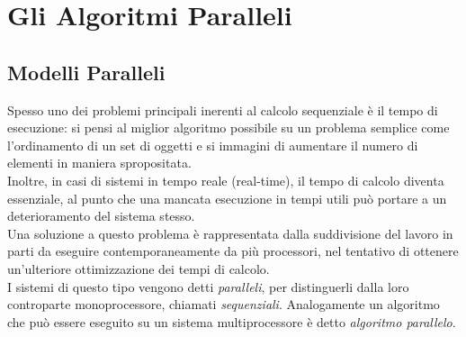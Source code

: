 \chapter{Gli Algoritmi Paralleli}
\section{Modelli Paralleli}
Spesso uno dei problemi principali inerenti al calcolo sequenziale è il tempo di esecuzione: si pensi al miglior algoritmo possibile su un problema semplice come l'ordinamento di un set di oggetti e si immagini di aumentare il numero di elementi in maniera spropositata.\\
Inoltre, in casi di sistemi in tempo reale (real-time), il tempo di calcolo diventa essenziale, al punto che una mancata esecuzione in tempi utili può portare a un deterioramento del sistema stesso.\\
Una soluzione a questo problema è rappresentata dalla suddivisione del lavoro in parti da eseguire contemporaneamente da più processori, nel tentativo di ottenere un'ulteriore ottimizzazione dei tempi di calcolo.\\
I sistemi di questo tipo vengono detti \textit{paralleli}, per distinguerli dalla loro controparte monoprocessore, chiamati \textit{sequenziali}. Analogamente un algoritmo che può essere eseguito su un sistema multiprocessore è detto \textit{algoritmo parallelo}.\\
